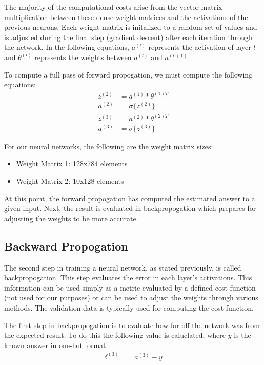 \documentclass[11pt]{article}
\begin{document}
The majority of the computational costs arise from the vector-matrix multiplication between these dense weight matrices and the activations of the previous neurons. Each weight matrix is initalized to a random set of values and is adjusted during the final step (gradient descent) after each iteration through the network. In the following equations, $a^{(l)}$ represents the activation of layer $l$ and $\theta^{(l)}$ represents the weights between $a^{(l)}$ and $a^{(l+1)}$
 
To compute a full pass of forward propogation, we must compute the following equations:
\begin{align*}
	z^{(2)} & = a^{(1)}*\theta^{(1)T} \\
	a^{(2)} & = \sigma\{z^{(2)}\}     \\
	z^{(3)} & = a^{(2)}*\theta^{(2)T} \\
	a^{(3)} & = \sigma\{z^{(3)}\}     
\end{align*}

For our neural networks, the following are the weight matrix sizes:
\begin{itemize}
	\item Weight Matrix 1: 128x784 elements
	\item Weight Matrix 2: 10x128 elements
\end{itemize}

At this point, the forward propogation has computed the estimated answer to a given input. Next, the result is evaluated in backpropogation which prepares for adjusting the weights to be more accurate.

\subsection{Backward Propogation}
The second step in training a neural network, as stated previously, is called backpropogation. This step evaluates the error in each layer's activations. This information can be used simply as a metric evaluated by a defined cost function (not used for our purposes) or can be used to adjust the weights through various methods. The validation data is typically used for computing the cost function.

The first step in backpropogation is to evaluate how far off the network was from the expected result. To do this the following value is caluclated, where $y$ is the known answer in one-hot format:
\begin{align*}
	\delta^{(3)} & = a^{(3)} - y 
\end{align*}
\end{document}
